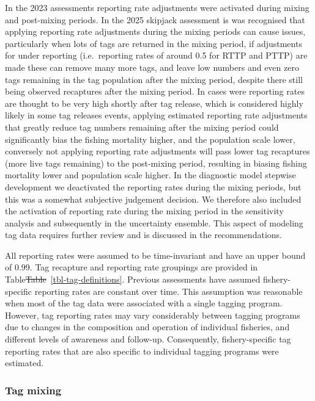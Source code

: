 \documentclass[
  english,
  a4paper,
  a4paper,
  11pt]{SCreport}
\providecommand{\DIFdel}[1]{{\protect\color{red}\sout{#1}}}                      %
\providecommand{\DIFdelbegin}{} %
\providecommand{\DIFdelend}{} %
\newcommand{\DIFscaledelfig}{0.5}
\newlength{\DIFdelgraphicswidth} %
\newlength{\DIFdelgraphicsheight} %
\newcommand{\DIFdelincludegraphics}[2][]{%
\sbox{\DIFdelgraphicsbox}{\DIFOincludegraphics[#1]{#2}}%
\settoboxwidth{\DIFdelgraphicswidth}{\DIFdelgraphicsbox} %
\settoboxtotalheight{\DIFdelgraphicsheight}{\DIFdelgraphicsbox} %
\scalebox{\DIFscaledelfig}{%
\parbox[b]{\DIFdelgraphicswidth}{\usebox{\DIFdelgraphicsbox}\\[-\baselineskip] \rule{\DIFdelgraphicswidth}{0em}}\llap{\resizebox{\DIFdelgraphicswidth}{\DIFdelgraphicsheight}{%
\setlength{\unitlength}{\DIFdelgraphicswidth}%
\begin{picture}(1,1)%
\thicklines\linethickness{2pt} %
{\color[rgb]{1,0,0}\put(0,0){\framebox(1,1){}}}%
{\color[rgb]{1,0,0}\put(0,0){\line( 1,1){1}}}%
{\color[rgb]{1,0,0}\put(0,1){\line(1,-1){1}}}%
\end{picture}%
}\hspace*{3pt}}} %
} %
\DeclareRobustCommand{\DIFdelbegin}{\DIFOdelbegin \let\includegraphics\DIFdelincludegraphics} %
\DeclareRobustCommand{\DIFdelend}{\DIFOaddend \let\includegraphics\DIFOincludegraphics} %
\begin{document}
In the 2023 assessments reporting rate adjustments were activated during
mixing and post-mixing periods. In the 2025 skipjack assessment is was
recognised that applying reporting rate adjustments during the mixing
periods can cause issues, particularly when lots of tags are returned in
the mixing period, if adjustments for under reporting (i.e.~reporting
rates of around 0.5 for RTTP and PTTP) are made these can remove many
more tags, and leave low numbers and even zero tags remaining in the tag
population after the mixing period, despite there still being observed
recaptures after the mixing period. In cases were reporting rates are
thought to be very high shortly after tag release, which is considered
highly likely in some tag releases events, applying estimated reporting
rate adjustments that greatly reduce tag numbers remaining after the
mixing period could significantly bias the fishing mortality higher, and
the population scale lower, conversely not applying reporting rate
adjustments will pass lower tag recaptures (more live tags remaining) to
the post-mixing period, resulting in biasing fishing mortality lower and
population scale higher. In the diagnostic model stepwise development we
deactivated the reporting rates during the mixing periods, but this was
a somewhat subjective judgement decision. We therefore also included the
activation of reporting rate during the mixing period in the sensitivity
analysis and subsequently in the uncertainty ensemble. This aspect of
modeling tag data requires further review and is discussed in the
recommendations.

All reporting rates were assumed to be time-invariant and have an upper
bound of 0.99. Tag recapture and reporting rate groupings are provided
in Table\DIFdelbegin \DIFdel{Table}\DIFdelend ~\ref{tbl-tag-definitions}. Previous assessments have assumed
fishery-specific reporting rates are constant over time. This assumption
was reasonable when most of the tag data were associated with a single
tagging program. However, tag reporting rates may vary considerably
between tagging programs due to changes in the composition and operation
of individual fisheries, and different levels of awareness and
follow-up. Consequently, fishery-specific tag reporting rates that are
also specific to individual tagging programs were estimated.

\subsubsection{Tag mixing}\label{sec-tag-mixing}
\end{document}
